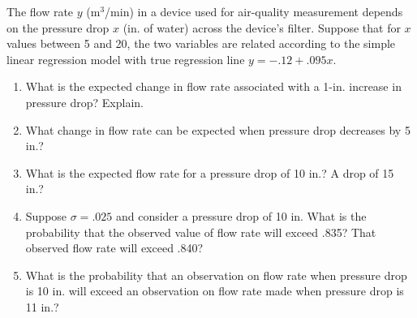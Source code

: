 \documentclass[11pt,letterpaper,boxed]{hmcpset}
\begin{document}
\begin{problem}[12.1.9]
	The flow rate $y$ (m$^3$/min) in a device used for air-quality measurement depends on the pressure drop $x$ (in. of water) across the device's filter. Suppose that for $x$ values between 5 and 20, the two variables are related according to the simple linear regression model with true regression line $y = -.12 + .095x$.
	\begin{enumerate}
		\item
			What is the expected change in flow rate associated with a 1-in. increase in pressure drop? Explain.
		\item
			What change in flow rate can be expected when pressure drop decreases by 5 in.?
		\item
			What is the expected flow rate for a pressure drop of 10 in.? A drop of 15 in.?
		\item
			Suppose $\sigma = .025$ and consider a pressure drop of 10 in. What is the probability that the observed value of flow rate will exceed .835? That observed flow rate will exceed .840?
		\item
			What is the probability that an observation on flow rate when pressure drop is 10 in. will exceed an observation on flow rate made when pressure drop is 11 in.?
	\end{enumerate}
\end{problem}

\begin{solution}
	\vfill
\end{solution}
\newpage

\end{document}
